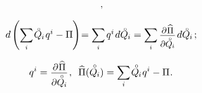 \begin{otherlanguage}{russian}
\begin{equation*}
\begin{array}{c}
\hspace{.2ex} ,
\\[1em]
%
\small
d \hspace{-0.1ex} \left( \scalebox{0.95}[1]{$\displaystyle \sum_{\smash{i}}$} \hspace{.2ex} \mathcircabove{Q}_{\hspace{-0.1ex}i} \hspace{.2ex} q^i - \potentialenergydensity \hspace{-0.1ex} \right) \hspace{-0.5ex}
= \scalebox{0.95}[1]{$\displaystyle \sum_{\smash{i}}$} \hspace{.32ex} q^i \hspace{.2ex} d\mathcircabove{Q}_{\hspace{-0.1ex}i}
= \scalebox{0.95}[1]{$\displaystyle \sum_{\smash{i}}$} \hspace{.4ex}
\scalebox{0.96}{$ \displaystyle \frac{\raisemath{-0.12em}{\partial \hspace{.1ex} \widehat{\potentialenergydensity}}}{\raisemath{-0.4em}{\partial \mathcircabove{Q}_{\hspace{-0.1ex}i}}} $}
\hspace{.25ex} d\mathcircabove{Q}_{\hspace{-0.1ex}i}
%
\hspace{.33ex} ;
\end{array}\end{equation*}%

\nopagebreak\vspace{-0.33em}\begin{equation}\label{Castigliano:theorem}
q^i = \scalebox{0.96}{$ \displaystyle \frac{\raisemath{-0.12em}{\partial \hspace{.1ex} \widehat{\potentialenergydensity}}}{\raisemath{-0.4em}{\partial \mathcircabove{Q}_{\hspace{-0.1ex}i}}} $} \hspace{.2ex} ,
\:\;
\widehat{\potentialenergydensity}(\mathcircabove{Q}_{\hspace{-0.1ex}i})
= \scalebox{0.95}[1]{$\displaystyle \sum_{\smash{i}}$} \hspace{.2ex} \mathcircabove{Q}_{\hspace{-0.1ex}i} \hspace{.12ex} q^i - \potentialenergydensity
\hspace{.1ex} .
\end{equation}


\end{otherlanguage}
